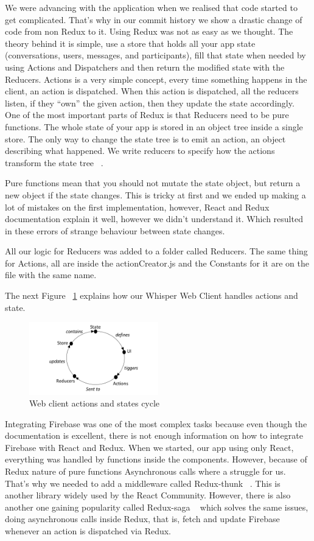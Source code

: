 We were advancing with the application when we realised that code started to get complicated. That’s why in our commit history we show a drastic change of code from non Redux to it.
Using Redux was not as easy as we thought. The theory behind it is simple, use a store that holds all your app state (conversations, users, messages, and participants), fill that state when needed by using Actions and Dispatchers and then return the modified state with the Reducers.
Actions is a very simple concept, every time something happens in the client, an action is dispatched. When this action is dispatched, all the reducers listen, if they “own” the given action, then they update the state accordingly. One of the most important parts of Redux is that Reducers need to be pure functions.
The whole state of your app is stored in an object tree inside a single store.
The only way to change the state tree is to emit an action, an object describing what happened. We write reducers to specify how the actions transform the state tree ~\cite{ryryyrt346}.

Pure functions mean that you should not mutate the state object, but return a new object if the state changes. This is tricky at first and we ended up making a lot of mistakes on the first implementation, however, React and Redux documentation explain it well, however we didn't understand it. Which resulted in these errors of strange behaviour between state changes.

All our logic for Reducers was added to a folder called Reducers. The same thing for Actions, all are inside the actionCreator.js and the Constants for it are on the file with the same name.

The next Figure ~\ref{fig:actions-states} explains how our Whisper Web Client handles actions and state.


\begin{figure}[ht]
\centering
\includegraphics[width=0.5\textwidth]{figs/actions-states}
	\caption{Web client actions and states cycle}
	\label{fig:actions-states}
\end{figure}


Integrating Firebase was one of the most complex tasks because even though the documentation is excellent, there is not enough information on how to integrate Firebase with React and Redux. When we started, our app using only React, everything was handled by functions inside the components. However, because of Redux nature of pure functions Asynchronous calls where a struggle for us. That's why we needed to add a middleware called Redux-thunk ~\cite{46rtrtet}. This is another library widely used by the React Community. However, there is also another one gaining popularity called Redux-saga ~\cite{5656ry} which solves the same issues, doing asynchronous calls inside Redux, that is, fetch and update Firebase whenever an action is dispatched via Redux.

